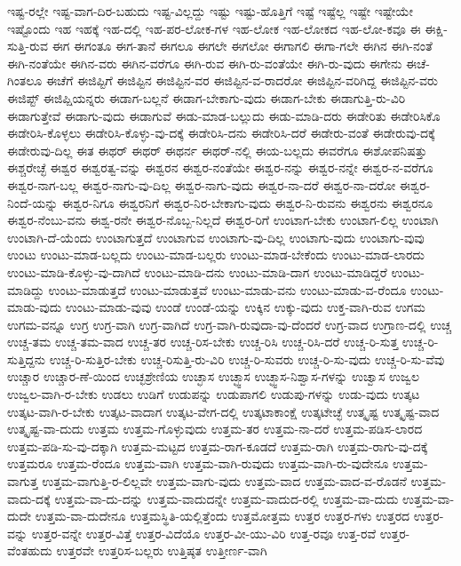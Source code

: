 {ಇಷ್ಟ-ರಲ್ಲೇ
ಇಷ್ಟ-ವಾಗ-ದಿರ-ಬಹುದು
ಇಷ್ಟ-ವಿಲ್ಲದ್ದು
ಇಷ್ಟು
ಇಷ್ಟು-ಹೊತ್ತಿಗೆ
ಇಷ್ಟೆ
ಇಷ್ಟೆಲ್ಲ
ಇಷ್ಟೇ
ಇಷ್ಟೇಯೇ
ಇಷ್ಟೊಂದು
ಇಹ
ಇಹಕ್ಕೆ
ಇಹ-ದಲ್ಲಿ
ಇಹ-ಪರ-ಲೋಕ-ಗಳ
ಇಹ-ಲೋಕ
ಇಹ-ಲೋಕದ
ಇಹ-ಲೋ-ಕವೂ
ಈ
ಈಕ್ಷಿ-ಸುತ್ತಿ-ರುವ
ಈಗ
ಈಗಂತೂ
ಈಗ-ತಾನೆ
ಈಗಲೂ
ಈಗಲೇ
ಈಗಲೋ
ಈಗಾಗಲಿ
ಈಗಾ-ಗಲೇ
ಈಗಿನ
ಈಗಿ-ನಂತೆ
ಈಗಿ-ನಂತೆಯೇ
ಈಗಿನ-ವರು
ಈಗಿನ-ವರೆಗೂ
ಈಗಿ-ರುವ
ಈಗಿ-ರು-ವಂತೆಯೇ
ಈಗಿ-ರು-ವುದು
ಈಗೇನು
ಈಚೆ-ಗಿಂತಲೂ
ಈಚೆಗೆ
ಈಜಿಪ್ಟಿಗೆ
ಈಜಿಪ್ಟಿನ
ಈಜಿಪ್ಟಿನ-ವರ
ಈಜಿಪ್ಟಿನ-ವ-ರಾದರೋ
ಈಜಿಪ್ಟಿನ-ವರಿಗಿದ್ದ
ಈಜಿಪ್ಟಿನ-ವರು
ಈಜಿಪ್ಟ್
ಈಜಿಪ್ಷಿಯನ್ನರು
ಈಡಾಗ-ಬಲ್ಲನೆ
ಈಡಾಗ-ಬೇಕಾಗು-ವುದು
ಈಡಾಗ-ಬೇಕು
ಈಡಾಗುತ್ತಿ-ರು-ವಿರಿ
ಈಡಾಗುತ್ತೇವೆ
ಈಡಾಗು-ವುದು
ಈಡಾಗುವೆ
ಈಡು-ಮಾಡ-ಬಲ್ಲುದು
ಈಡು-ಮಾಡಿ-ದರು
ಈಡೇರಿತು
ಈಡೇರಿಸಿಕೊ
ಈಡೇರಿಸಿ-ಕೊಳ್ಳಲು
ಈಡೇರಿಸಿ-ಕೊಳ್ಳು-ವು-ದಕ್ಕೆ
ಈಡೇರಿಸಿ-ದನು
ಈಡೇರಿಸಿ-ದರೆ
ಈಡೇರು-ವಂತೆ
ಈಡೇರುವು-ದಕ್ಕೆ
ಈಡೇರುವು-ದಿಲ್ಲ
ಈತ
ಈಥರ್
ಈಥರ್
ಈಥರ್ನ
ಈಥರ್-ನಲ್ಲಿ
ಈಯ-ಬಲ್ಲದು
ಈವರೆಗೂ
ಈಶೋಪನಿಷತ್ತು
ಈಶ್ಚರೇಚ್ಛೆ
ಈಶ್ವರ
ಈಶ್ವರತ್ವ-ವನ್ನು
ಈಶ್ವರನ
ಈಶ್ವರ-ನಂತೆಯೇ
ಈಶ್ವರ-ನನ್ನು
ಈಶ್ವರ-ನನ್ನೇ
ಈಶ್ವರ-ನ-ವರೆಗೂ
ಈಶ್ವರ-ನಾಗ-ಬಲ್ಲ
ಈಶ್ವರ-ನಾಗು-ವು-ದಿಲ್ಲ
ಈಶ್ವರ-ನಾಗು-ವುದು
ಈಶ್ವರ-ನಾ-ದರೆ
ಈಶ್ವರ-ನಾ-ದರೋ
ಈಶ್ವರ-ನಿಂದೆ-ಯನ್ನು
ಈಶ್ವರ-ನಿಗೂ
ಈಶ್ವರನಿಗೆ
ಈಶ್ವರ-ನಿರ-ಬೇಕಾಗು-ವುದು
ಈಶ್ವರ-ನಿ-ರುವನು
ಈಶ್ವರನು
ಈಶ್ವರನೂ
ಈಶ್ವರ-ನೆಂಬು-ವನು
ಈಶ್ವ-ರನೇ
ಈಶ್ವರ-ನೊಬ್ಬ-ನಿಲ್ಲದೆ
ಈಶ್ವರ-ರಿಗೆ
ಉಂಟಾಗ-ಬೇಕು
ಉಂಟಾಗ-ಲಿಲ್ಲ
ಉಂಟಾಗಿ
ಉಂಟಾಗಿ-ದೆ-ಯೆಂದು
ಉಂಟಾಗುತ್ತದೆ
ಉಂಟಾಗುವ
ಉಂಟಾಗು-ವು-ದಿಲ್ಲ
ಉಂಟಾಗು-ವುದು
ಉಂಟಾಗು-ವುವು
ಉಂಟು
ಉಂಟು-ಮಾಡ-ಬಲ್ಲದು
ಉಂಟು-ಮಾಡ-ಬಲ್ಲರು
ಉಂಟು-ಮಾಡ-ಬೇಕೆಂದು
ಉಂಟು-ಮಾಡ-ಲಾರದು
ಉಂಟು-ಮಾಡಿ-ಕೊಳ್ಳು-ವು-ದಾಗಿದೆ
ಉಂಟು-ಮಾಡಿ-ದನು
ಉಂಟು-ಮಾಡಿ-ದಾಗ
ಉಂಟು-ಮಾಡಿದ್ದರೆ
ಉಂಟು-ಮಾಡಿದ್ದು
ಉಂಟು-ಮಾಡುತ್ತದೆ
ಉಂಟು-ಮಾಡುತ್ತವೆ
ಉಂಟು-ಮಾಡು-ವನು
ಉಂಟು-ಮಾಡು-ವ-ರೆಂದೂ
ಉಂಟು-ಮಾಡು-ವುದು
ಉಂಟು-ಮಾಡು-ವುವು
ಉಂಡೆ
ಉಂಡೆ-ಯನ್ನು
ಉಕ್ಕಿನ
ಉಕ್ಕು-ವುದು
ಉಕ್ತ-ವಾಗಿ-ರುವ
ಉಗಮ
ಉಗಮ-ವನ್ನೂ
ಉಗ್ರ
ಉಗ್ರ-ವಾಗಿ
ಉಗ್ರ-ವಾಗಿದೆ
ಉಗ್ರ-ವಾಗಿ-ರುವುದಾ-ವು-ದೆಂದರೆ
ಉಗ್ರ-ವಾದ
ಉಗ್ರಾಣ-ದಲ್ಲಿ
ಉಚ್ಚ
ಉಚ್ಚ-ತಮ
ಉಚ್ಚ-ತಮ-ವಾದ
ಉಚ್ಚ-ತರ
ಉಚ್ಚ-ರಿಸ-ಬೇಕು
ಉಚ್ಚ-ರಿಸಿ
ಉಚ್ಚ-ರಿಸಿ-ದರೆ
ಉಚ್ಚ-ರಿ-ಸುತ್ತ
ಉಚ್ಚ-ರಿ-ಸುತ್ತಿದ್ದನು
ಉಚ್ಚ-ರಿ-ಸುತ್ತಿರ-ಬೇಕು
ಉಚ್ಚ-ರಿಸುತ್ತಿ-ರು-ವಿರಿ
ಉಚ್ಚ-ರಿ-ಸುವರು
ಉಚ್ಚ-ರಿ-ಸು-ವುದು
ಉಚ್ಚ-ರಿ-ಸು-ವೆವು
ಉಚ್ಚಾರ
ಉಚ್ಚಾರ-ಣೆ-ಯಿಂದ
ಉಚ್ಛಶ್ರೇಣಿಯ
ಉಚ್ಛಾಸ
ಉಚ್ಛ್ವಾಸ
ಉಚ್ಛ್ವಾಸ-ನಿಶ್ವಾಸ-ಗಳನ್ನು
ಉಚ್ವಾಸ
ಉಜ್ವಲ
ಉಜ್ವಲ-ವಾಗಿ-ರ-ಬೇಕು
ಉಡಲು
ಉಡಿಗೆ
ಉಡುಪನ್ನು
ಉಡುಪಾಗಲಿ
ಉಡುಪು-ಗಳನ್ನು
ಉಡು-ವುದು
ಉತ್ಕಟ
ಉತ್ಕಟ-ವಾಗಿ-ರ-ಬೇಕು
ಉತ್ಕಟ-ವಾದಾಗ
ಉತ್ಕಟ-ವೇಗ-ದಲ್ಲಿ
ಉತ್ಕಟಾಕಾಂಕ್ಷೆ
ಉತ್ಕಟೇಚ್ಛೆ
ಉತ್ಕೃಷ್ಟ
ಉತ್ಕೃಷ್ಟ-ವಾದ
ಉತ್ಕೃಷ್ಟ-ವಾ-ದುದು
ಉತ್ತಮ
ಉತ್ತಮ-ಗೊಳ್ಳುವುದು
ಉತ್ತಮ-ತರ
ಉತ್ತಮ-ನಾ-ದರೆ
ಉತ್ತಮ-ಪಡಿಸ-ಲಾರದ
ಉತ್ತಮ-ಪಡಿ-ಸು-ವು-ದಕ್ಕಾಗಿ
ಉತ್ತಮ-ಮಟ್ಟದ
ಉತ್ತಮ-ರಾಗ-ಕೂಡದೆ
ಉತ್ತಮ-ರಾಗಿ
ಉತ್ತಮ-ರಾಗು-ವು-ದಕ್ಕೆ
ಉತ್ತಮರೂ
ಉತ್ತಮ-ರೆಂದೂ
ಉತ್ತಮ-ವಾಗಿ
ಉತ್ತಮ-ವಾಗಿ-ರುವುದು
ಉತ್ತಮ-ವಾಗಿ-ರು-ವುದೇನೂ
ಉತ್ತಮ-ವಾಗುತ್ತ
ಉತ್ತಮ-ವಾಗುತ್ತಿ-ರ-ಲಿಲ್ಲವೇ
ಉತ್ತಮ-ವಾಗು-ವುದು
ಉತ್ತಮ-ವಾದ
ಉತ್ತಮ-ವಾದ-ವ-ರೊಡನೆ
ಉತ್ತಮ-ವಾದು-ದಕ್ಕೆ
ಉತ್ತಮ-ವಾ-ದು-ದನ್ನು
ಉತ್ತಮ-ವಾದುದನ್ನೇ
ಉತ್ತಮ-ವಾದುದ-ರಲ್ಲಿ
ಉತ್ತಮ-ವಾ-ದುದು
ಉತ್ತಮ-ವಾ-ದುದೇ
ಉತ್ತಮ-ವಾ-ದುದೇನೂ
ಉತ್ತಮಸ್ಥಿತಿ-ಯಲ್ಲಿತ್ತೆಂದು
ಉತ್ತಮೋತ್ತಮ
ಉತ್ತರ
ಉತ್ತರ-ಗಳು
ಉತ್ತರದ
ಉತ್ತರ-ವನ್ನು
ಉತ್ತರ-ವನ್ನೇ
ಉತ್ತರ-ವಿತ್ತೆ
ಉತ್ತರ-ವಿದೆಯೊ
ಉತ್ತರ-ವೀ-ಯು-ವಿರಿ
ಉತ್ತ-ರವೂ
ಉತ್ತ-ರವೆ
ಉತ್ತರ-ವೆಂತಹುದು
ಉತ್ತರವೇ
ಉತ್ತರಿಸ-ಬಲ್ಲರು
ಉತ್ತಿಷ್ಠತ
ಉತ್ತೀರ್ಣ-ವಾಗಿ
}
